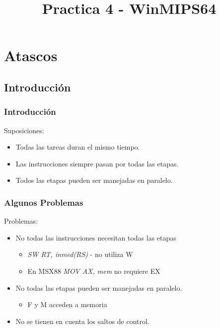 \documentclass{beamer}
\title{Practica 4 - WinMIPS64}
\begin{document}
\section{Atascos}

\subsection{Introducción}
\begin{frame}
\frametitle{Introducción}
Suposiciones:
\begin{itemize}
\item Todas las tareas duran el mismo tiempo.
\item Las instrucciones siempre pasan por todas las etapas.
\item Todos las etapas pueden ser manejadas en paralelo.
\end{itemize}
\end{frame}

\begin{frame}
\frametitle{Algunos Problemas}
Problemas:
\begin{itemize}
\item  No todas las instrucciones necesitan todas las etapas
\begin{itemize}
\item \emph{SW RT, inmed(RS)} -  no utiliza W
\item En MSX88 \emph{MOV AX, mem} no requiere EX
\end{itemize}
 \item No todas las etapas pueden ser manejadas en paralelo.
\begin{itemize}
\item F y M acceden a memoria
\end{itemize}
\item No se tienen en cuenta los saltos de control.
\end{itemize}
\end{frame}
\end{document}
